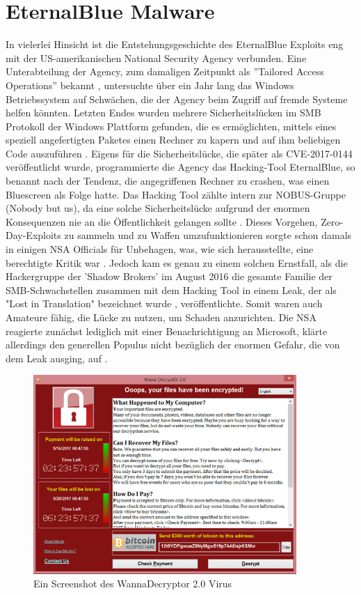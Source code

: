 \documentclass[DIV=12,headings=normal,pdftex,headinclude=false,footinclude=false,final]{scrreprt}
\begin{document}
\chapter{EternalBlue Malware}
In vielerlei Hinsicht ist die Entstehungsgeschichte des EternalBlue Exploits eng mit der US-amerikanischen National Security Agency verbunden. Eine Unterabteilung der Agency, zum damaligen Zeitpunkt als ''Tailored Access Operations'' bekannt \cite{CS}, untersuchte über ein Jahr lang das Windows Betriebssystem auf Schwächen, die der Agency beim Zugriff auf fremde Systeme helfen könnten\cite{WP}. Letzten Endes wurden mehrere Sicherheitslücken im SMB Protokoll der Windows Plattform gefunden, die es ermöglichten, mittels eines speziell angefertigten Paketes einen Rechner zu kapern und auf ihm beliebigen Code auszuführen \cite{Avast}.
Eigens für die Sicherheitslücke, die später als CVE-2017-0144 veröffentlicht wurde, programmierte die Agency das Hacking-Tool EternalBlue, so benannt nach der Tendenz, die angegriffenen Rechner zu crashen, was einen Bluescreen als Folge hatte. Das Hacking Tool zählte intern zur NOBUS-Gruppe (Nobody but us), da eine solche Sicherheitslücke aufgrund der enormen Konsequenzen nie an die Öffentlichkeit gelangen sollte \cite{CS}. Dieses Vorgehen, Zero-Day-Exploits zu sammeln und zu Waffen umzufunktionieren sorgte schon damals in einigen NSA Officials für Unbehagen, was, wie sich herausstellte, eine berechtigte Kritik war \cite{WP}.
Jedoch kam es genau zu einem solchen Ernstfall, als die Hackergruppe der 'Shadow Brokers' im August 2016 die gesamte Familie der SMB-Schwachstellen zusammen mit dem Hacking Tool in einem Leak, der als "Lost in Translation" bezeichnet wurde \cite{Medium:ExpBible}, veröffentlichte. Somit waren auch Amateure fähig, die Lücke zu nutzen, um Schaden anzurichten. Die NSA reagierte zunächst lediglich mit einer Benachrichtigung an Microsoft, klärte allerdings den generellen Populus nicht bezüglich der enormen Gefahr, die von dem Leak ausging, auf \cite{WP}.

\begin{figure}[H]
    \centering
    \includegraphics[width=10cm]{wanna_decrypt0r_2.0.png}
    \caption[WannaDecryptor Screenshot (SecureList) URL: \url{securelist.com/wannacry-ransomware-used-in-widespread-attacks-all-over-the-world/78351/}]{Ein Screenshot des  WannaDecryptor 2.0 Virus}
    \label{img:wanna_decrypt0r}
\end{figure}
\end{document}
